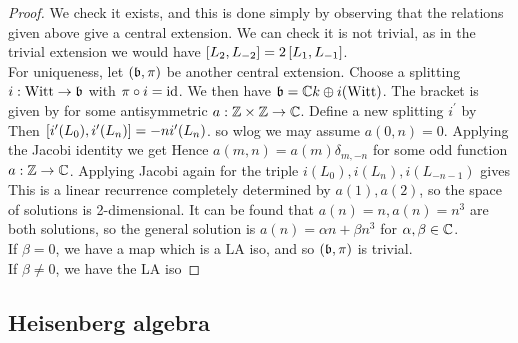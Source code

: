 \documentclass{article}
\begin{document}
\begin{proof}
We check it exists, and this is done simply by observing that the relations given above give a central extension. We can check it is not trivial, as in the trivial extension we would have $\comm[L_2]{L_{-2}} = 2\comm[L_1]{L_{-1}}$. \\
For uniqueness, let $(\mf{b},\pi)$ be another central extension. Choose a splitting $i:\Witt \to \mf{b}$ with $\pi \circ i = \id$. We then have $\mf{b} = \mbb{C}k \oplus i(\Witt)$. The bracket is given by 
for some antisymmetric $a: \mbb{Z} \times \mbb{Z} \to \mbb{C}$. Define a new splitting $i^\prime$ by 
Then $\comm[i^\prime(L_0)]{i^\prime(L_n)} = -ni^\prime(L_n)$. so wlog we may assume $a(0,n) = 0$. Applying the Jacobi identity we get 
Hence $a(m,n) = a(m)\delta_{m,-n}$ for some odd function $a: \mbb{Z} \to \mbb{C}$. Applying Jacobi again for the triple $i(L_0), i(L_n), i(L_{-n-1})$ gives 
This is a linear recurrence completely determined by $a(1), a(2)$, so the space of solutions is 2-dimensional. It can be found that $a(n) = n, a(n) = n^3$ are both solutions, so the general solution is $a(n) = \alpha n + \beta n^3$ for $\alpha,\beta \in \mbb{C}$. \\
If $\beta = 0$, we have a map 
which is a LA iso, and so $(\mf{b},\pi)$ is trivial. \\
If $\beta \neq 0$, we have the LA iso
\end{proof}

\subsection{Heisenberg algebra}
\end{document}

